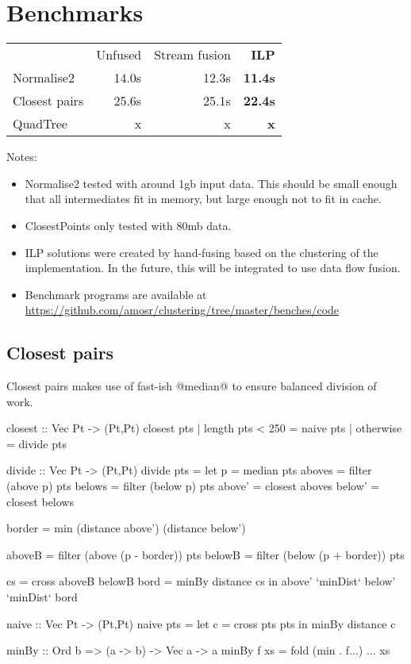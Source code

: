 \section{Benchmarks}
\label{s:Benchmarks}

\begin{tabular}{lrrr}
                &   Unfused         & Stream fusion   & \textbf{ ILP               }\\
Normalise2      &   14.0s           & 12.3s           & \textbf{ 11.4s             }\\
Closest pairs   &   25.6s           & 25.1s           & \textbf{ 22.4s             }\\
QuadTree        &   x               & x               & \textbf{ x                 }\\
\end{tabular}

Notes:
\begin{itemize}
\item
Normalise2 tested with around 1gb input data. This should be small enough that all intermediates fit in memory, but large enough not to fit in cache.
\item
ClosestPoints only tested with 80mb data.
\item
ILP solutions were created by hand-fusing based on the clustering of the implementation. In the future, this will be integrated to use data flow fusion.
\item
Benchmark programs are available at \url{https://github.com/amosr/clustering/tree/master/benches/code}
\end{itemize}


\subsection{Closest pairs}
Closest pairs makes use of fast-ish @median@ to ensure balanced division of work.
\begin{code}
closest :: Vec Pt -> (Pt,Pt)
closest pts
 | length pts < 250
 = naive pts
 | otherwise
 = divide pts

divide :: Vec Pt -> (Pt,Pt)
divide pts
 = let p      = median pts
       aboves = filter (above p) pts
       belows = filter (below p) pts
       above' = closest aboves
       below' = closest belows

       border = min (distance above') (distance below')

       aboveB = filter (above (p - border)) pts
       belowB = filter (below (p + border)) pts

       cs     = cross aboveB belowB
       bord   = minBy distance cs
   in  above' `minDist` below' `minDist` bord


naive :: Vec Pt -> (Pt,Pt)
naive pts
 = let c = cross pts pts
   in  minBy distance c

minBy :: Ord b => (a -> b) -> Vec a -> a
minBy f xs
 = fold (min . f...) ... xs
\end{code}

